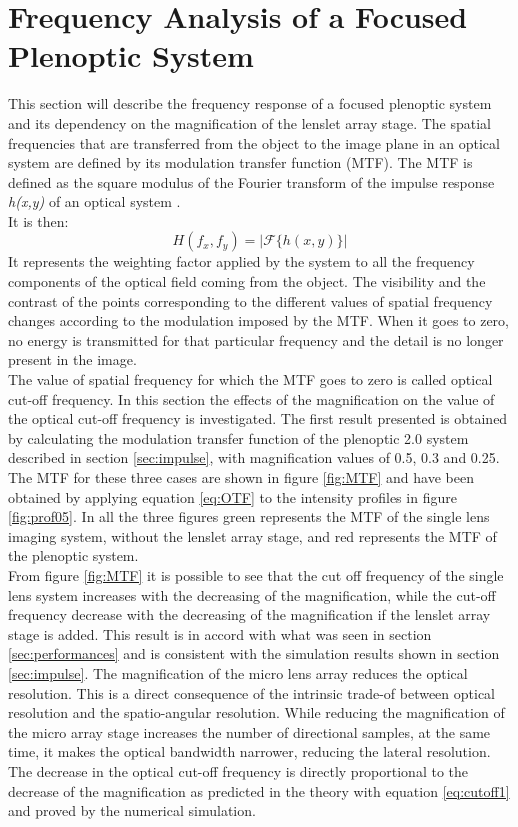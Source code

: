 \section{Frequency Analysis of a Focused Plenoptic System}
\label{sec:freq}
This section will describe the frequency response of a focused plenoptic system and its dependency on the magnification of the lenslet array stage. The spatial frequencies that are transferred from the object to the image plane in an optical system are defined by its modulation transfer function (MTF). The MTF is defined as the square modulus of the Fourier transform of the impulse response \textit{h(x,y)} of an optical system \cite{goodman2005introduction}. \\
It is then:
\begin{equation}
	\label{eq:OTF}
	H(f_x,f_y) = |\mathcal{F}\{h(x,y)\}|
\end{equation}
It represents the weighting factor applied by the system to all the frequency components of the optical field coming from the object. The visibility and the contrast of the points corresponding to the different values of spatial frequency changes according to the modulation imposed by the MTF. When it goes to zero, no energy is transmitted for that particular frequency and the detail is no longer present in the image.\\
The value of spatial frequency  for which the MTF goes to zero is called optical cut-off frequency. In this section the effects of the magnification on the value of the optical cut-off frequency is investigated. The first result presented is obtained by calculating the modulation transfer function of the plenoptic 2.0 system described in section \ref{sec:impulse}, with magnification values of 0.5, 0.3 and 0.25. The MTF for these three cases are shown in figure \ref{fig:MTF} and have been obtained by applying equation \ref{eq:OTF} to the intensity profiles in figure \ref{fig:prof05}. In all the three figures green represents the MTF of the single lens imaging system, without the lenslet array stage, and red represents the MTF of the plenoptic system.\\
From figure \ref{fig:MTF} it is possible to see that the cut off frequency of the single lens system increases with the decreasing of the magnification, while the cut-off frequency decrease with the decreasing of the magnification if the lenslet array stage is added. This result is in accord with what was seen in section \ref{sec:performances} and is consistent with the simulation results shown in section \ref{sec:impulse}. The magnification of the micro lens array reduces the optical resolution. This is a direct consequence of the intrinsic trade-of between optical resolution and the spatio-angular resolution. While reducing the magnification of the micro array stage increases the number of directional samples, at the same time, it makes the optical bandwidth narrower, reducing the lateral resolution. The decrease in the optical cut-off frequency is directly proportional to the decrease of the magnification as predicted in the theory with equation \ref{eq:cutoff1} and proved by the numerical simulation. 
